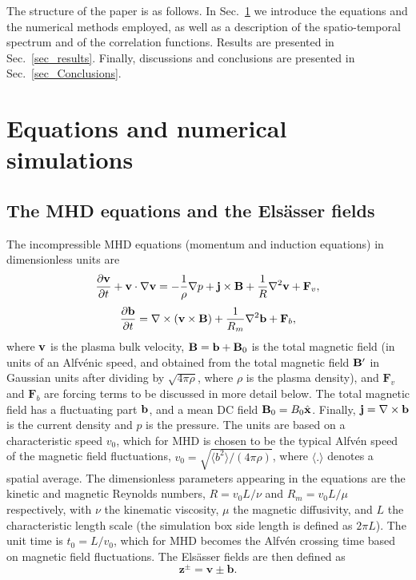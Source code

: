 \documentclass[aip,pop,reprint,amsmath,amssymb,floatfix]{revtex4-1}
\let\oldhat\hat
\renewcommand{\vec}[1]{\mathbf{#1}}
\renewcommand{\hat}[1]{\oldhat{\mathbf{#1}}}
\begin{document}
The structure of the paper is as follows. In Sec.~\ref{sec_EqNumSim}
we introduce the equations and the numerical methods employed, as well
as a description of the spatio-temporal spectrum and of the
correlation functions. Results are presented in
Sec.~\ref{sec_results}. Finally, discussions and conclusions are
presented in Sec.~\ref{sec_Conclusions}.

\section{Equations and numerical simulations}\label{sec_EqNumSim}

\subsection{The MHD equations and the Els\"asser fields}\label{sec_eq}
The incompressible MHD equations (momentum and induction equations) in
dimensionless units are
\begin{equation}\label{eq:MHD_v}
  \frac {\partial {\bf v}}{\partial t} +
  {\bf v }\cdot \nabla {\bf v} = -\frac{1}{\rho}\nabla p +
  {\bf j} \times {\bf B} + \frac{1}{R} \nabla^2{\bf v} + \vec{F}_v,
\end{equation}
\begin{equation}\label{eq:MHD_b}
  \frac{\partial {\bf b}}{\partial t} = \nabla \times ({\bf v} 
  \times {\bf B}) + \frac{1}{R_m} \nabla^2 {\bf b} + \vec{F}_b,
\end{equation}
where ${\bf v}$ is the plasma bulk velocity, ${\bf B} = {\bf b} + {\bf B}_0$ is the total magnetic field (in units
of an Alfv\'enic speed, and obtained from the total magnetic field
${\bf B}'$ in Gaussian units after dividing by $\sqrt{4\pi\rho}$,
where $\rho$ is the plasma density), and $\vec{F}_v$ and $\vec{F}_b$ are forcing terms to be discussed in more detail below. The total magnetic field has a
fluctuating part ${\bf b}$, and a mean DC field
${\bf B}_0=B_0\hat{x}$. Finally, ${\bf j} = \nabla \times {\bf b}$ is
the current density and $p$ is the pressure. The units are based on a
characteristic speed $v_0$, which for MHD is chosen to be the typical
Alfv\'en speed of the magnetic field fluctuations,
$v_0 = \sqrt{\langle b^2 \rangle /(4\pi\rho)}$, where
$\langle . \rangle$ denotes a spatial average. The dimensionless
parameters appearing in the equations are the kinetic and magnetic
Reynolds numbers, $R=v_0 L/\nu$ and $R_m = v_0 L /\mu$ respectively,
with $\nu$ the kinematic viscosity, $\mu$ the magnetic diffusivity, and
$L$ the characteristic length scale (the simulation box side length is
defined as $2\pi L$). The unit time is $t_0 = L/v_0$, which for MHD
becomes the Alfv\'en crossing time based on magnetic field
fluctuations. The Els\"asser fields are then defined as
\begin{equation}\label{eq:MHD_zdef}
\vec{z}^\pm = \vec{v} \pm \vec{b} .
\end{equation}
\end{document}
